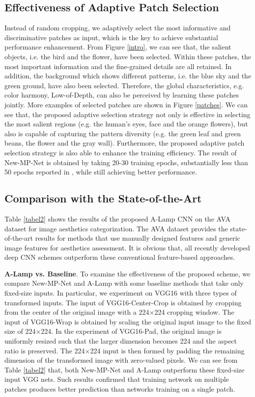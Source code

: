 \documentclass[10pt,twocolumn,letterpaper]{article}
\begin{document}
	\subsection{Effectiveness of Adaptive Patch Selection}
	Instead of random cropping, we adaptively select the most informative and discriminative patches as input, which is the key to achieve substantial performance enhancement. From Figure \ref{intro}, we can see that, the salient objects, i.e. the bird and the flower, have been selected. Within these patches, the most important information and the fine-grained details are all retained. In addition, the background which shows different patterns, i.e. the blue sky and the green ground, have also been selected. Therefore, the global characteristics, e.g. color harmony, Low-of-Depth, can also be perceived by learning these patches jointly. More examples of selected patches are shown in Figure \ref{patches}. We can see that, the proposed adaptive selection strategy not only is effective in selecting the most salient regions (e.g. the human's eyes, face and the orange flowers), but also is capable of capturing the pattern diversity (e.g. the green leaf and green beans, the flower and the gray wall). Furthermore, the proposed adaptive patch selection strategy is also able to enhance the training efficiency. The result of New-MP-Net is obtained by taking 20-30 training epochs, substantially less than 50 epochs reported in \cite{Lu:2015:ICCV}, while still achieving  better performance. 
	
	\subsection{Comparison with the State-of-the-Art}
	Table \ref{tabel2} shows the results of the proposed A-Lamp CNN on the AVA dataset \cite{Murray:MMP2012:AVA} for image aesthetics categorization. The AVA dataset provides the state-of-the-art results for methods that use manually designed features and generic image features for aesthetics assessment. It is obvious that, all recently developed deep CNN schemes outperform these conventional feature-based approaches.
	
	\textbf{A-Lamp vs. Baseline}.
	To examine the effectiveness of the proposed scheme, we compare New-MP-Net and A-Lamp with some baseline methods that take only fixed-size inputs. In particular, we experiment on VGG16 with three types of transformed inputs.
	The input of VGG16-Center-Crop is obtained by cropping  from the center of the original image with a 224$\times$224 cropping window. The input of VGG16-Wrap is obtained by scaling the original input image to the fixed size of 224$\times$224. In the experiment of VGG16-Pad, the original image is uniformly resized such that the larger dimension becomes 224 and the aspect ratio is preserved. The 224$\times$224 input is then formed by padding the remaining dimension of the transformed image with zero-valued pixels.
	We can see from Table \ref{tabel2} that, both New-MP-Net and A-Lamp outperform these fixed-size input VGG nets. Such results confirmed that training network on multiple patches produces better prediction than networks training on a single patch.
	
\end{document}
